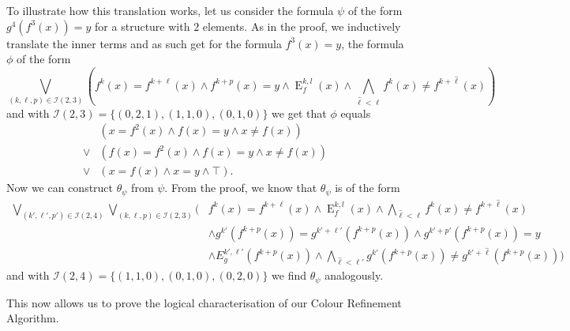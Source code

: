 To illustrate how this translation works, let us consider the formula $\psi$ of the form $g^4(f^3(x))=y$ for a structure with $2$ elements.
As in the proof, we inductively translate the inner terms and as such get for the formula $f^3(x)=y$, the formula $\phi$ of the form
$$\bigvee_{(k,\ell,p)\in \mathcal I(2,3)}\left(f^k(x)=f^{k+\ell}(x)\land f^{k+p}(x)=y \land \operatorname{E}^{k,l}_f(x)\land\bigwedge_{\hat \ell < \ell} f^k(x)\neq f^{k+\hat\ell}(x)\right)$$
and with $\mathcal I(2,3)=\{(0,2,1),(1,1,0),(0,1,0)\}$ we get that $\phi$ equals
\begin{align*}
	\phantom{\lor}&\left(x=f^2(x) \land f(x)=y \land x\neq f(x)\right) \\
	\lor & \left(f(x)=f^2(x) \land f(x)=y \land x \neq f(x)\right) \\
	\lor & \left(x=f(x) \land x=y \land \top\right).
\end{align*}
Now we can construct $\theta_\psi$ from $\psi$. 
From the proof, we know that $\theta_\psi$ is of the form
\begin{align*}
	\bigvee_{(k',\ell',p')\in \mathcal I(2,4)}\bigvee_{(k,\ell,p)\in \mathcal I(2,3)} (
	&f^k(x)=f^{k+\ell}(x)\land \operatorname{E}^{k,l}_f(x)\land\bigwedge_{\hat{\ell}<\ell}f^k(x)\neq f^{k+\hat\ell}(x) \\
	& \land g^{k'}(f^{k+p}(x))=g^{k'+\ell'}(f^{k+p}(x)) \land g^{k'+p'}(f^{k+p}(x)) = y \\
	& \land E^{k',\ell'}_g(f^{k+p}(x)) \land \bigwedge_{\hat{\ell}<\ell'}g^{k'}(f^{k+p}(x))\neq g^{k'+\hat\ell}(f^{k+p}(x)))
\end{align*}
and with $\mathcal I(2,4)=\{(1,1,0),(0,1,0), (0,2,0)\}$ we find $\theta_\psi$ analogously.

This now allows us to prove the logical characterisation of our Colour Refinement Algorithm.


